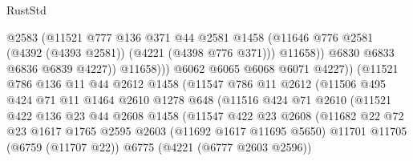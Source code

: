 \begin{lexlean}{RustStd}
\begin{coremodule}
{\begin{coremodule}
{{{{{{{{{{{{{{{{{{{{{{{{{{{{{{{                                  @2583
                                  (@11521
                                    @777
                                    @136
                                    @371
                                    @44
                                    @2581
                                    @1458
                                    (@11646
                                      @776
                                      @2581
                                      (@4392 (@4393 @2581))
                                      (@4221 (@4398 @776 @371)))
                                    @11658))
                                @6830
                                @6833
                                @6836
                                @6839
                                @4227))
                            @11658)))
                      @6062
                      @6065
                      @6068
                      @6071
                      @4227))
                  (@11521
                    @786
                    @136
                    @11
                    @44
                    @2612
                    @1458
                    (@11547
                      @786
                      @11
                      @2612
                      (@11506
                        @495
                        @424
                        @71
                        @11
                        @1464
                        @2610
                        @1278
                        @648
                        (@11516
                          @424
                          @71
                          @2610
                          (@11521
                            @422
                            @136
                            @23
                            @44
                            @2608
                            @1458
                            (@11547
                              @422
                              @23
                              @2608
                              (@11682
                                @22
                                @72
                                @23
                                @1617
                                @1765
                                @2595
                                @2603
                                (@11692 @1617 @11695 @5650)
                                @11701
                                @11705
                                (@6759 (@11707 @22))
                                @6775
                                (@4221 (@6777 @2603 @2596))
}}}}}}}}}}}}}}}}}}}}}}}}}}}}}}}
\end{coremodule}}
\end{coremodule}
\end{lexlean}

